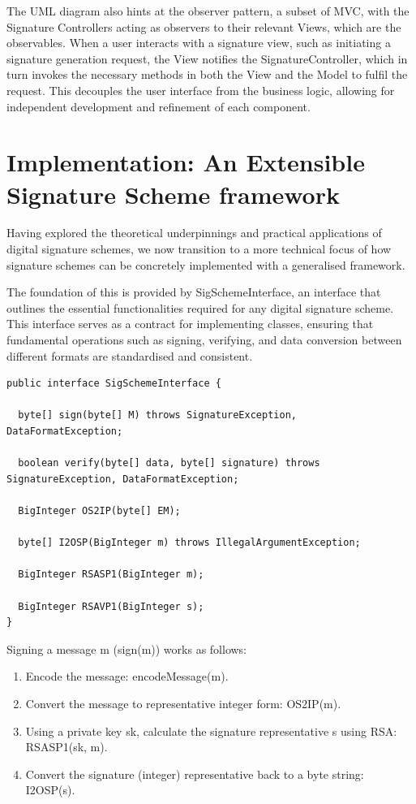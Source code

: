 \documentclass[]{final_report}
\theoremstyle{definition}
\begin{document}
The UML diagram also hints at the observer pattern, a subset of MVC, with the Signature Controllers acting as observers to their relevant Views, which are the observables. When a user interacts with a signature view, such as initiating a signature generation request, the View notifies the SignatureController, which in turn invokes the necessary methods in both the View and the Model to fulfil the request. This decouples the user interface from the business logic, allowing for independent development and refinement of each component.


\section{Implementation: An Extensible Signature Scheme framework}
Having explored the theoretical underpinnings and practical applications of digital signature schemes, we now transition to a more technical focus of how signature schemes can be concretely implemented with a generalised framework.

The foundation of this is provided by SigSchemeInterface, an interface that outlines the essential functionalities required for any digital signature scheme. This interface serves as a contract for implementing classes, ensuring that fundamental operations such as signing, verifying, and data conversion between different formats are standardised and consistent.

\begin{lstlisting}[caption=SigSchemeInterface Interface code] 
public interface SigSchemeInterface {

  byte[] sign(byte[] M) throws SignatureException, DataFormatException;

  boolean verify(byte[] data, byte[] signature) throws SignatureException, DataFormatException;

  BigInteger OS2IP(byte[] EM);

  byte[] I2OSP(BigInteger m) throws IllegalArgumentException;

  BigInteger RSASP1(BigInteger m);

  BigInteger RSAVP1(BigInteger s);
}
 \end{lstlisting}

Signing a message m (sign(m)) works as follows:
\begin{enumerate}
\item Encode the message: encodeMessage(m).

\item Convert the message to representative integer form: OS2IP(m).

\item Using a private key sk, calculate the signature representative s using RSA: RSASP1(sk, m).

\item Convert the signature (integer) representative back to a byte string: I2OSP(s).
\end{enumerate}
\end{document}

